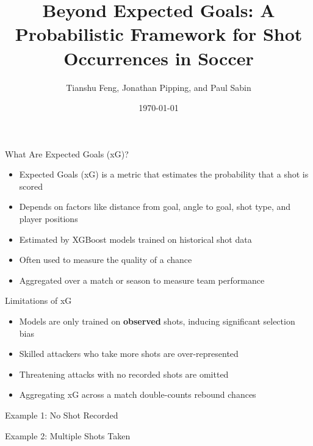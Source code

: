 \documentclass{beamer}
\title[Beyond Expected Goals]{Beyond Expected Goals: A Probabilistic Framework for Shot Occurrences in Soccer}
\author[Feng, Pipping, and Sabin]{Tianshu Feng, Jonathan Pipping, and Paul Sabin}
\date{\today}
\institute[UPenn]{University of Pennsylvania}
\begin{document}
\frame{\titlepage}

\begin{frame}{What Are Expected Goals (xG)?}
\begin{itemize}
\item Expected Goals (xG) is a metric that estimates the probability that a shot is scored
\item Depends on factors like distance from goal, angle to goal, shot type, and player positions
\item Estimated by XGBoost models trained on historical shot data
\item Often used to measure the quality of a chance
\item Aggregated over a match or season to measure team performance
\end{itemize}
\end{frame}

\begin{frame}{Limitations of xG}
\begin{itemize}
\item Models are only trained on \textbf{observed} shots, inducing significant selection bias
\item Skilled attackers who take more shots are over-represented
\item Threatening attacks with no recorded shots are omitted
\item Aggregating xG across a match double-counts rebound chances
\end{itemize}
\end{frame}

\begin{frame}{Example 1: No Shot Recorded}

\end{frame}

\begin{frame}{Example 2: Multiple Shots Taken}

\end{frame}
\end{document}
